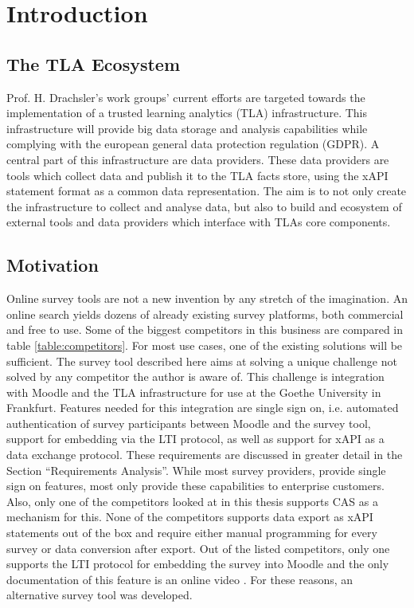 \section{Introduction}


\subsection{The TLA Ecosystem}
    Prof. H. Drachsler's work groups' current efforts are targeted towards the implementation
    of a trusted learning analytics (TLA) infrastructure. This infrastructure will
    provide big data storage and analysis capabilities while complying with the european general
    data protection regulation (GDPR). A central part of this infrastructure are data
    providers. These data providers are tools which collect data and publish it to
    the TLA facts store, using the xAPI statement format as a common data representation.
    The aim is to not only create the infrastructure to collect and analyse data,
    but also to build and ecosystem of external tools and data providers
    which interface with TLAs core components.

\subsection{Motivation}
    Online survey tools are not a new invention by any stretch of the imagination.
    An online search yields dozens of already existing survey platforms, both
    commercial and free to use. Some of the biggest competitors in this business
    are compared in table \ref{table:competitors}. For most use cases, one
    of the existing solutions will be sufficient. The survey tool described here
    aims at solving a unique challenge not solved by any competitor the author
    is aware of. This challenge is integration with Moodle and the TLA
    infrastructure for use at the Goethe University in Frankfurt.
    Features needed for this integration are single sign on, i.e.
    automated authentication of survey participants between Moodle and
    the survey tool, support for embedding via the LTI protocol, 
    as well as support for xAPI as a data exchange protocol.
    These requirements are discussed in greater detail in the Section
    ``Requirements Analysis''. While most survey providers, provide single
    sign on features, most only provide these capabilities to enterprise
    customers. Also, only one of the competitors looked at in this thesis
    supports CAS as a mechanism for this. None of the competitors
    supports data export as xAPI statements out of the box and require either
    manual programming for every survey or data conversion after export. 
    Out of the listed competitors, only one supports the LTI protocol for
    embedding the survey into Moodle and the only documentation of this 
    feature is an online video \cite{qualtrics-lti-video}. For these
    reasons, an alternative survey tool was developed.

